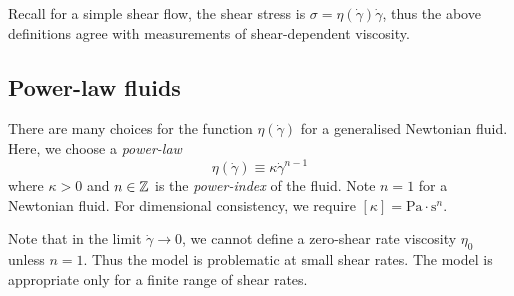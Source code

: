 \documentclass{jknotes}
\newcommand{\srate}{\dot{\gamma}}
\begin{document}
Recall for a simple shear flow, the shear stress is $\sigma =
\eta(\srate)\srate$, thus the above definitions agree with measurements of
shear-dependent viscosity.

\subsection{Power-law fluids}
There are many choices for the function $\eta(\srate)$ for a generalised
Newtonian fluid. Here, we choose a \emph{power-law}
\begin{equation}
	\eta(\srate) \equiv \kappa \srate^{n-1}
\end{equation}
where $\kappa > 0$ and $n \in \mathbb{Z}$ is the \emph{power-index} of the fluid.
Note $n=1$ for a Newtonian fluid. For dimensional consistency, we require
$\left[\kappa\right] = \text{Pa}\cdot\text{s}^n$.

\begin{center}
\end{center}

Note that in the limit $\srate \to 0$, we cannot define a zero-shear rate
viscosity $\eta_0$ unless $n=1$. Thus the model is problematic at small shear
rates. The model is appropriate only for a finite range of shear rates.
\end{document}
